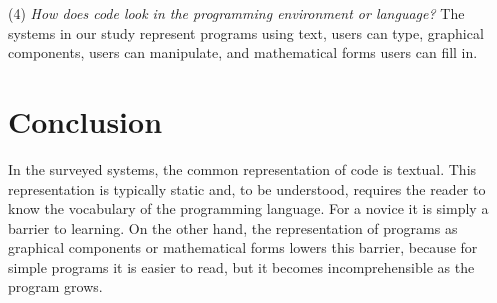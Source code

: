 (4) \textit{How does code look in the programming environment or language?} The systems in our study represent programs using text, users can type, graphical components, users can manipulate, and mathematical forms users can fill in.

\section{Conclusion}

In the surveyed systems, the common representation of code is textual. This representation is typically static and, to be understood, requires the reader to know the vocabulary of the programming language. For a novice it is simply a barrier to learning. On the other hand, the representation of programs as graphical components or mathematical forms lowers this barrier, because for simple programs it is easier to read, but it becomes incomprehensible as the program grows.